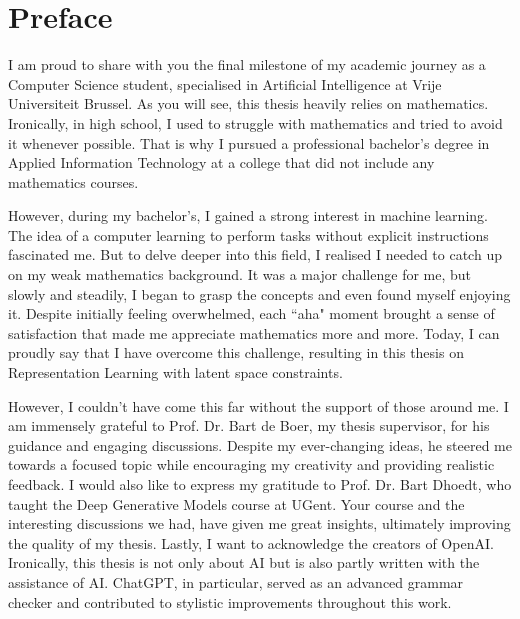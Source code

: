\chapter*{Preface}

I am proud to share with you the final milestone of my academic journey as a Computer Science student, specialised in Artificial Intelligence at Vrije Universiteit Brussel. As you will see, this thesis heavily relies on mathematics. Ironically, in high school, I used to struggle with mathematics and tried to avoid it whenever possible. That is why I pursued a professional bachelor's degree in Applied Information Technology at a college that did not include any mathematics courses.

However, during my bachelor's, I gained a strong interest in machine learning. The idea of a computer learning to perform tasks without explicit instructions fascinated me. But to delve deeper into this field, I realised I needed to catch up on my weak mathematics background. It was a major challenge for me, but slowly and steadily, I began to grasp the concepts and even found myself enjoying it. Despite initially feeling overwhelmed, each ``aha" moment brought a sense of satisfaction that made me appreciate mathematics more and more. Today, I can proudly say that I have overcome this challenge, resulting in this thesis on Representation Learning with latent space constraints.

However, I couldn't have come this far without the support of those around me. I am immensely grateful to Prof. Dr. Bart de Boer, my thesis supervisor, for his guidance and engaging discussions. Despite my ever-changing ideas, he steered me towards a focused topic while encouraging my creativity and providing realistic feedback. I would also like to express my gratitude to Prof. Dr. Bart Dhoedt, who taught the Deep Generative Models course at UGent. Your course and the interesting discussions we had, have given me great insights, ultimately improving the quality of my thesis. Lastly, I want to acknowledge the creators of OpenAI. Ironically, this thesis is not only about AI but is also partly written with the assistance of AI. ChatGPT, in particular, served as an advanced grammar checker and contributed to stylistic improvements throughout this work.







